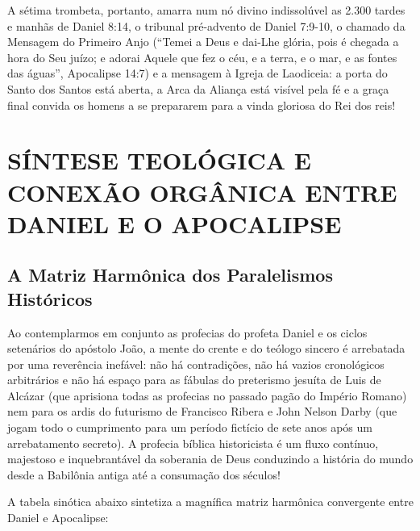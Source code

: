 A sétima trombeta, portanto, amarra num nó divino indissolúvel as 2.300 tardes e manhãs de Daniel 8:14, o tribunal pré-advento de Daniel 7:9-10, o chamado da Mensagem do Primeiro Anjo (``Temei a Deus e dai-Lhe glória, pois é chegada a hora do Seu juízo; e adorai Aquele que fez o céu, e a terra, e o mar, e as fontes das águas'', Apocalipse 14:7) e a mensagem à Igreja de Laodiceia: a porta do Santo dos Santos está aberta, a Arca da Aliança está visível pela fé e a graça final convida os homens a se prepararem para a vinda gloriosa do Rei dos reis!


\section{SÍNTESE TEOLÓGICA E CONEXÃO ORGÂNICA ENTRE DANIEL E O APOCALIPSE}



\subsection{A Matriz Harmônica dos Paralelismos Históricos}


Ao contemplarmos em conjunto as profecias do profeta Daniel e os ciclos setenários do apóstolo João, a mente do crente e do teólogo sincero é arrebatada por uma reverência inefável: não há contradições, não há vazios cronológicos arbitrários e não há espaço para as fábulas do preterismo jesuíta de Luis de Alcázar (que aprisiona todas as profecias no passado pagão do Império Romano) nem para os ardis do futurismo de Francisco Ribera e John Nelson Darby (que jogam todo o cumprimento para um período fictício de sete anos após um arrebatamento secreto).
A profecia bíblica historicista é um fluxo contínuo, majestoso e inquebrantável da soberania de Deus conduzindo a história do mundo desde a Babilônia antiga até a consumação dos séculos!

A tabela sinótica abaixo sintetiza a magnífica matriz harmônica convergente entre Daniel e Apocalipse:


